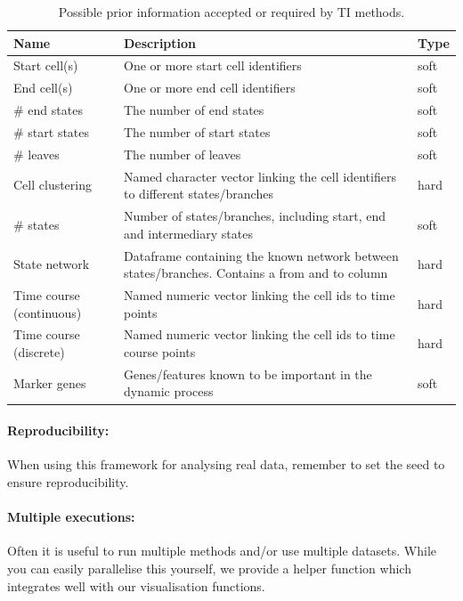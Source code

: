 \begin{table}
	\caption{Possible prior information accepted or required by TI methods.}\label{tab:prior}
	\footnotesize
	\begin{tabularx}{\linewidth}{lXl}
		\toprule
		Name & Description & Type\\
		\midrule
		Start cell(s) & One or more start cell identifiers & soft\\
	  End cell(s) & One or more end cell identifiers & soft\\
		\# end states & The number of end states & soft\\
		\# start states & The number of start states & soft\\
		\# leaves & The number of leaves & soft\\
		\addlinespace
		Cell clustering & Named character vector linking the cell identifiers to different states/branches & hard\\
		\# states & Number of states/branches, including start, end and intermediary states & soft\\
		State network & Dataframe containing the known network between states/branches. Contains a from and to column & hard\\
		Time course (continuous) & Named numeric vector linking the cell ids to time points & hard\\
		Time course (discrete) & Named numeric vector linking the cell ids to time course points & hard\\
		\addlinespace
		Marker genes & Genes/features known to be important in the dynamic process & soft\\
		\bottomrule
	\end{tabularx}
\end{table}

\paragraph{Reproducibility:} When using this framework for analysing real data, remember to set the seed to ensure reproducibility.


\paragraph{Multiple executions:} Often it is useful to run multiple methods and/or use multiple datasets. While you can easily parallelise this yourself, we provide a helper
function which integrates well with our visualisation functions.

